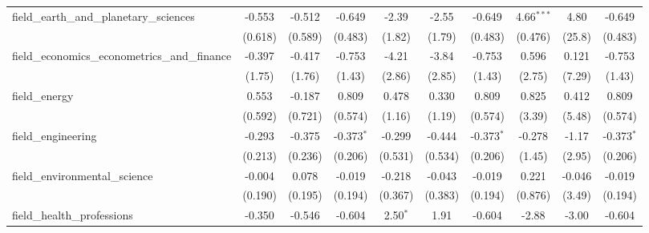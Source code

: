 \begin{tabular}{lccccccccc}
   field\_earth\_and\_planetary\_sciences                      & -0.553         & -0.512         & -0.649        & -2.39         & -2.55         & -0.649        & 4.66$^{***}$  & 4.80    & -0.649\\   
                                                               & (0.618)        & (0.589)        & (0.483)       & (1.82)        & (1.79)        & (0.483)       & (0.476)       & (25.8)  & (0.483)\\   
   field\_economics\_econometrics\_and\_finance                & -0.397         & -0.417         & -0.753        & -4.21         & -3.84         & -0.753        & 0.596         & 0.121   & -0.753\\   
                                                               & (1.75)         & (1.76)         & (1.43)        & (2.86)        & (2.85)        & (1.43)        & (2.75)        & (7.29)  & (1.43)\\   
   field\_energy                                               & 0.553          & -0.187         & 0.809         & 0.478         & 0.330         & 0.809         & 0.825         & 0.412   & 0.809\\   
                                                               & (0.592)        & (0.721)        & (0.574)       & (1.16)        & (1.19)        & (0.574)       & (3.39)        & (5.48)  & (0.574)\\   
   field\_engineering                                          & -0.293         & -0.375         & -0.373$^{*}$  & -0.299        & -0.444        & -0.373$^{*}$  & -0.278        & -1.17   & -0.373$^{*}$\\   
                                                               & (0.213)        & (0.236)        & (0.206)       & (0.531)       & (0.534)       & (0.206)       & (1.45)        & (2.95)  & (0.206)\\   
   field\_environmental\_science                               & -0.004         & 0.078          & -0.019        & -0.218        & -0.043        & -0.019        & 0.221         & -0.046  & -0.019\\   
                                                               & (0.190)        & (0.195)        & (0.194)       & (0.367)       & (0.383)       & (0.194)       & (0.876)       & (3.49)  & (0.194)\\   
   field\_health\_professions                                  & -0.350         & -0.546         & -0.604        & 2.50$^{*}$    & 1.91          & -0.604        & -2.88         & -3.00   & -0.604\\   

\end{tabular}
